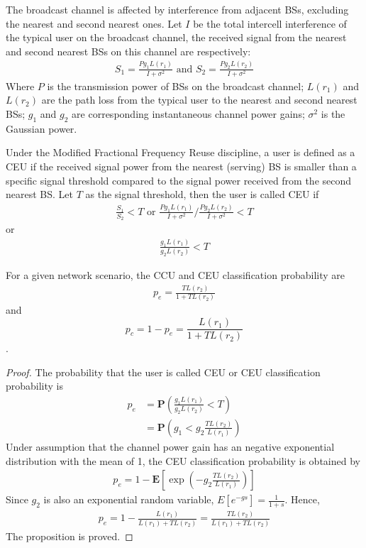 \documentclass{svproc}
\begin{document}
The broadcast channel is affected by interference from adjacent BSs, excluding the nearest and second nearest ones. Let $I$ be the total intercell interference of the typical user on the broadcast channel, the received signal from the nearest and second nearest BSs on this channel are respectively:
\begin{align}
	S_1 = \frac{Pg_1 L(r_1)}{I + \sigma^2} \text{ and } S_2 = \frac{Pg_2 L(r_2)}{I + \sigma^2}
\end{align}
Where $P$ is the transmission power of BSs on the broadcast channel; $L(r_1)$ and $L(r_2)$ are the path loss from the typical user to the nearest and second nearest BSs; $g_1$ and $g_2$ are corresponding instantaneous channel power gains; $\sigma^2$ is the Gaussian power.

Under the Modified Fractional Frequency Reuse discipline, a user is defined as a CEU if the received signal power from the nearest (serving) BS is smaller than a specific signal threshold compared to the signal power received from the second nearest BS. Let $T$ as the signal threshold, then the user is called CEU if
\begin{align}
	\frac{S_1}{S_2} < T \text{ or }\frac{Pg_1 L(r_1)}{I + \sigma^2} / \frac{Pg_2 L(r_2)}{I + \sigma^2} < T
\end{align}
or 
\begin{align}
	\frac{g_1L(r_1)}{g_2L(r_2)}<T
\end{align}

\begin{proposition}
	For a given network scenario, the CCU and CEU classification probability are
	\begin{align}
		p_e = \frac{TL(r_2)}{1+TL(r_2)}
	\end{align}	
	and $$p_c = 1-p_e=\frac{L(r_1)}{1+TL(r_2)}$$.
\end{proposition}


\begin{proof}
	The probability that the user is called CEU or CEU classification probability is 
	\begin{align}
		p_e& = \mathbf{P}\left(\frac{g_1L(r_1)}{g_2L(r_2)}<T\right) \nonumber\\
		&= \mathbf{P}\left(g_1<g_2\frac{TL(r_2)}{L(r_1)}\right)
	\end{align}
	Under assumption that the channel power gain has an negative exponential distribution with the mean of 1, the CEU classification probability is obtained by
	\begin{align}
		p_e = 1-\mathbf{E}\left[\exp\left(-g_2\frac{TL(r_2)}{L(r_1)}\right)\right]
	\end{align}
	Since $g_2$ is also an exponential random variable, $E[e^{-gs}]=\frac{1}{1+s}$. Hence,
	\begin{align}
		p_e = 1-\frac{L(r_1)}{L(r_1)+TL(r_2)} = \frac{TL(r_2)}{L(r_1)+TL(r_2)}
	\end{align}	
	The proposition is proved.
\end{proof}
\end{document}
